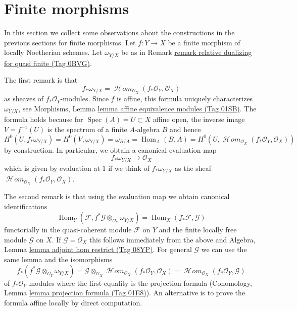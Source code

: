 \documentclass{amsart}
\theoremstyle{plain}
\theoremstyle{definition}
\theoremstyle{remark}
\numberwithin{equation}{subsection}
\def\Spec{\mathop{\mathrm{Spec}}}
\def\Hom{\mathop{\mathrm{Hom}}\nolimits}
\def\SheafHom{\mathop{\mathcal{H}\!\mathit{om}}\nolimits}
\begin{document}
\section{Finite morphisms}
\label{discriminant-section-finite-morphisms}

\noindent
In this section we collect some observations about the
constructions in the previous sections for finite morphisms.
Let $f : Y \to X$ be a finite morphism of locally Noetherian schemes.
Let $\omega_{Y/X}$ be as in
Remark \href{https://stacks.math.columbia.edu/tag/0BVG}{remark relative dualizing for quasi finite (Tag 0BVG)}.

\medskip\noindent
The first remark is that
$$
f_*\omega_{Y/X} = \SheafHom_{\mathcal{O}_X}(f_*\mathcal{O}_Y, \mathcal{O}_X)
$$
as sheaves of $f_*\mathcal{O}_Y$-modules. Since $f$ is affine, this
formula uniquely characterizes $\omega_{Y/X}$, see
Morphisms, Lemma \href{https://stacks.math.columbia.edu/tag/01SB}{lemma affine equivalence modules (Tag 01SB)}.
The formula holds because for $\Spec(A) = U \subset X$ affine open, the
inverse image $V = f^{-1}(U)$ is the spectrum of a finite $A$-algebra
$B$ and hence
$$
H^0(U, f_*\omega_{Y/X}) =
H^0(V, \omega_{Y/X}) =
\omega_{B/A} =
\Hom_A(B, A) =
H^0(U, \SheafHom_{\mathcal{O}_X}(f_*\mathcal{O}_Y, \mathcal{O}_X))
$$
by construction. In particular, we obtain a canonical evaluation map
$$
f_*\omega_{Y/X} \longrightarrow \mathcal{O}_X
$$
which is given by evaluation at $1$ if we think of $f_*\omega_{Y/X}$
as the sheaf $\SheafHom_{\mathcal{O}_X}(f_*\mathcal{O}_Y, \mathcal{O}_X)$.

\medskip\noindent
The second remark is that using the evaluation map we obtain
canonical identifications
$$
\Hom_Y(\mathcal{F}, f^*\mathcal{G} \otimes_{\mathcal{O}_Y} \omega_{Y/X})
=
\Hom_X(f_*\mathcal{F}, \mathcal{G})
$$
functorially in the quasi-coherent module $\mathcal{F}$ on $Y$
and the finite locally free module $\mathcal{G}$ on $X$.
If $\mathcal{G} = \mathcal{O}_X$ this follows immediately
from the above and
Algebra, Lemma \href{https://stacks.math.columbia.edu/tag/08YP}{lemma adjoint hom restrict (Tag 08YP)}.
For general $\mathcal{G}$ we can use the same lemma and the
isomorphisms
$$
f_*(f^*\mathcal{G} \otimes_{\mathcal{O}_Y} \omega_{Y/X}) =
\mathcal{G} \otimes_{\mathcal{O}_X}
\SheafHom_{\mathcal{O}_X}(f_*\mathcal{O}_Y, \mathcal{O}_X) =
\SheafHom_{\mathcal{O}_X}(f_*\mathcal{O}_Y, \mathcal{G})
$$
of $f_*\mathcal{O}_Y$-modules where the first equality is the
projection formula
(Cohomology, Lemma \href{https://stacks.math.columbia.edu/tag/01E8}{lemma projection formula (Tag 01E8)}).
An alternative is to prove the formula affine locally by
direct computation.
\end{document}

